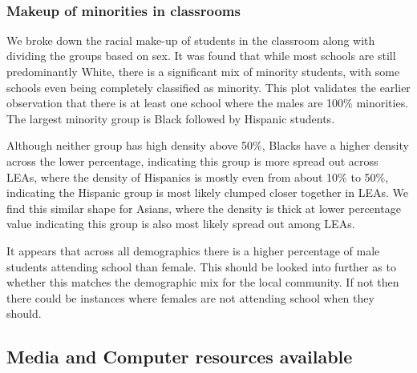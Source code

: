 \documentclass[11pt]{article}
\begin{document}
    \begin{center}
    \end{center}
    { \hspace*{\fill} \\}
    
    \subsubsection{Makeup of minorities in
classrooms}\label{makeup-of-minorities-in-classrooms}

We broke down the racial make-up of students in the classroom along with
dividing the groups based on sex. It was found that while most schools
are still predominantly White, there is a significant mix of minority
students, with some schools even being completely classified as
minority. This plot validates the earlier observation that there is at
least one school where the males are 100\% minorities. The largest
minority group is Black followed by Hispanic students.

Although neither group has high density above 50\%, Blacks have a higher
density across the lower percentage, indicating this group is more
spread out across LEAs, where the density of Hispanics is mostly even
from about 10\% to 50\%, indicating the Hispanic group is most likely
clumped closer together in LEAs. We find this similar shape for Asians,
where the density is thick at lower percentage value indicating this
group is also most likely spread out among LEAs.

It appears that across all demographics there is a higher percentage of
male students attending school than female. This should be looked into
further as to whether this matches the demographic mix for the local
community. If not then there could be instances where females are not
attending school when they should.

    \subsection{Media and Computer resources
available}\label{media-and-computer-resources-available}
\end{document}
